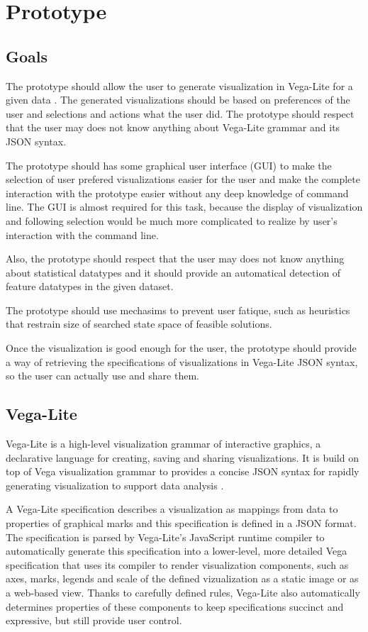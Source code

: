 \chapter{Prototype}
\section{Goals}
  The prototype should allow the user to generate visualization in Vega-Lite for a given data . The generated visualizations should be based on preferences of the user and selections and actions what the user did. The prototype should respect that the user may does not know anything about Vega-Lite grammar and its JSON syntax.

  The prototype should has some graphical user interface (GUI) to make the selection of user prefered visualizations easier for the user and make the complete interaction with the prototype easier without any deep knowledge of command line. The GUI is almost required for this task, because the display of visualization and following selection would be much more complicated to realize by user's interaction with the command line.

  Also, the prototype should respect that the user may does not know anything about statistical datatypes and it should provide an automatical detection of feature datatypes in the given dataset.

  The prototype should use mechasims to prevent user fatique, such as heuristics that restrain size of searched state space of feasible solutions.

  Once the visualization is good enough for the user, the prototype should provide a way of retrieving the specifications of visualizations in Vega-Lite JSON syntax, so the user can actually use and share them.
\section{Vega-Lite}
  Vega-Lite is a high-level visualization grammar of interactive graphics, a declarative language for creating, saving and sharing visualizations. It is build on top of Vega visualization grammar to provides a concise JSON syntax for rapidly generating visualization to support data analysis \cite{vega}.

  A Vega-Lite specification describes a visualization as mappings from data to properties of graphical marks and this specification is defined in a JSON format\cite{vega}. The specification is parsed by Vega-Lite's JavaScript runtime compiler to automatically generate this specification into a lower-level, more detailed Vega \cite{vega-not-lite} specification that uses its compiler to render visualization components, such as axes, marks, legends and scale of the defined vizualization as a static image or as a web-based view. Thanks to carefully defined rules, Vega-Lite also automatically determines properties of these components to keep specifications succinct and expressive, but still provide user control.

